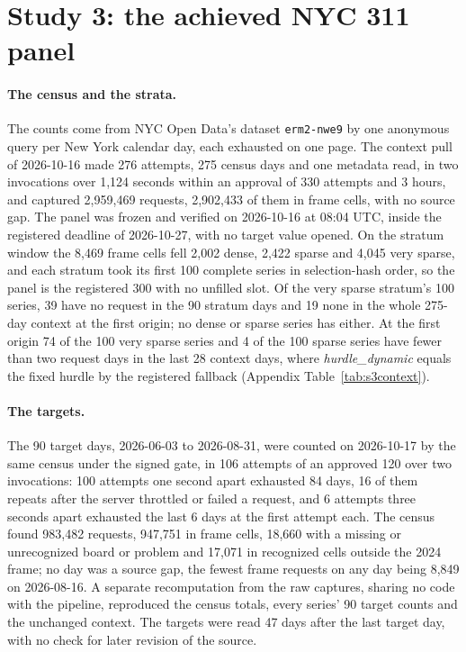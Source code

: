 \providecommand{\qs}{QScore9}

\section{Study 3: the achieved NYC 311 panel}
\label{sec:s3panel}

\paragraph{The census and the strata.} The counts come from NYC Open Data's dataset \texttt{erm2-nwe9} by
one anonymous query per New York calendar day, each exhausted on one page. The context pull of 2026-10-16
made 276 attempts, 275 census days and one metadata read, in two invocations over 1,124 seconds within an
approval of 330 attempts and 3 hours, and captured 2,959,469 requests, 2,902,433 of them in frame cells,
with no source gap. The panel was frozen and verified on 2026-10-16 at 08:04 UTC, inside the registered
deadline of 2026-10-27, with no target value opened. On the stratum window the 8,469 frame cells fell 2,002
dense, 2,422 sparse and 4,045 very sparse, and each stratum took its first 100 complete series in
selection-hash order, so the panel is the registered 300 with no unfilled slot. Of the very sparse stratum's
100 series, 39 have no request in the 90 stratum days and 19 none in the whole 275-day context at the first
origin; no dense or sparse series has either. At the first origin 74 of the 100 very sparse series and 4 of
the 100 sparse series have fewer than two request days in the last 28 context days, where
\emph{hurdle\_dynamic} equals the fixed hurdle by the registered fallback (Appendix
Table~\ref{tab:s3context}).

\paragraph{The targets.} The 90 target days, 2026-06-03 to 2026-08-31, were counted on 2026-10-17 by the
same census under the signed gate, in 106 attempts of an approved 120 over two invocations: 100 attempts one
second apart exhausted 84 days, 16 of them repeats after the server throttled or failed a request, and 6
attempts three seconds apart exhausted the last 6 days at the first attempt each. The census found 983,482
requests, 947,751 in frame cells, 18,660 with a missing or unrecognized board or problem and 17,071 in
recognized cells outside the 2024 frame; no day was a source gap, the fewest frame requests on any day being
8,849 on 2026-08-16. A separate recomputation from the raw captures, sharing no code with the pipeline,
reproduced the census totals, every series' 90 target counts and the unchanged context. The targets were
read 47 days after the last target day, with no check for later revision of the source.

